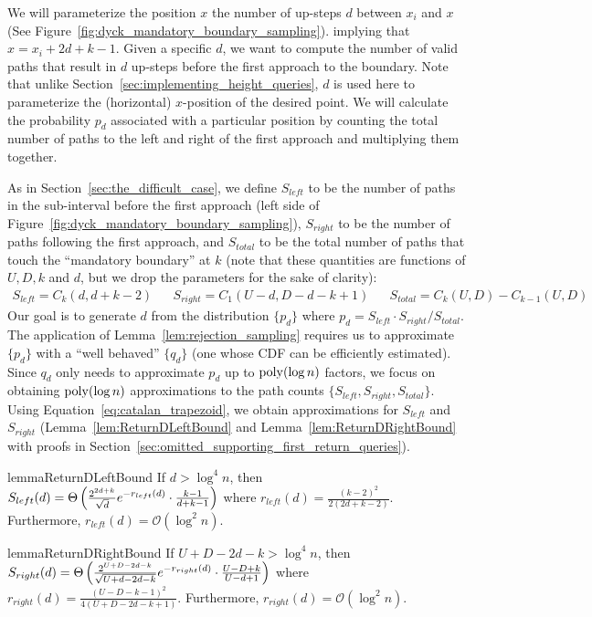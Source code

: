 We will parameterize the position $x$ the number of up-steps $d$ between $x_i$ and $x$ (See Figure~\ref{fig:dyck_mandatory_boundary_sampling}).
implying that $x = x_{i} + 2d + k - 1$.
Given a specific $d$, we want to compute the number of valid paths that result in
$d$ up-steps before the first approach to the boundary.
Note that unlike Section~\ref{sec:implementing_height_queries}, $d$ is used here to parameterize the (horizontal) $x$-position of the desired point.
We will calculate the probability $p_d$ associated with a particular position
by counting the total number of paths to the left and right of the first approach and multiplying them together.

As in Section~\ref{sec:the_difficult_case}, we define
$S_{left}$ to be the number of paths in the sub-interval before the first approach (left side of Figure~\ref{fig:dyck_mandatory_boundary_sampling}),
$S_{right}$ to be the number of paths following the first approach,
and $S_{total}$ to be the total number of paths that touch the ``mandatory boundary'' at $k$
(note that these quantities are functions of $U,D,k$ and $d$, but we drop the parameters for the sake of clarity):
{\small
\begin{align*}
    S_{left} = C_{k}(d, d+k-2)
    &&S_{right} = C_1(U-d, D-d-k+1)
    &&S_{total} = C_k(U,D) - C_{k-1}(U,D)
\end{align*}}
Our goal is to generate $d$ from the distribution $\{ p_d\}$ where $p_d = S_{left}\cdot S_{right}/S_{total}$.
The application of Lemma~\ref{lem:rejection_sampling} requires us to approximate $\{p_d\}$
with a ``well behaved'' $\{q_d\}$ (one whose CDF can be efficiently estimated).
Since $q_d$ only needs to approximate $p_d$ up to $\mathrm{poly}(\log n)$ factors,
we focus on obtaining $\mathrm{poly}(\log n)$ approximations to the path counts $\{ S_{left},S_{right},S_{total}\}$.
Using Equation~\ref{eq:catalan_trapezoid}, we obtain approximations for $S_{left}$ and $S_{right}$
(Lemma~\ref{lem:ReturnDLeftBound} and Lemma~\ref{lem:ReturnDRightBound} with proofs in Section~\ref{sec:omitted_supporting_first_return_queries}).
\begin{restatable}{lemma}{ReturnDLeftBound}
\label{lem:ReturnDLeftBound}
If $d > \log^4 n$, then $S_{left}(d)
= \Theta\left( \frac{2^{2d+k}}{\sqrt{d}}\mathlarger e^{-r_{left}(d)}\cdot \frac{k-1}{d+k-1}\right)$
where $r_{left}(d) = \frac{(k-2)^2}{2(2d+k-2)}$.
Furthermore, $r_{left}(d)=\mathcal O(\log^2 n)$.
\end{restatable}

\begin{restatable}{lemma}{ReturnDRightBound}
\label{lem:ReturnDRightBound}
If $U+D-2d-k > \log^4 n$, then $S_{right}(d)
= \Theta\left( \frac{2^{U+D-2d-k}}{\sqrt{U+d-2d-k}}\mathlarger e^{-r_{right}(d)}\cdot \frac{U-D+k}{U-d+1}\right)$
where $r_{right}(d) = \frac{(U-D-k-1)^2}{4(U+D-2d-k+1)}$.
Furthermore, $r_{right}(d)=\mathcal O(\log^2 n)$.
\end{restatable}

